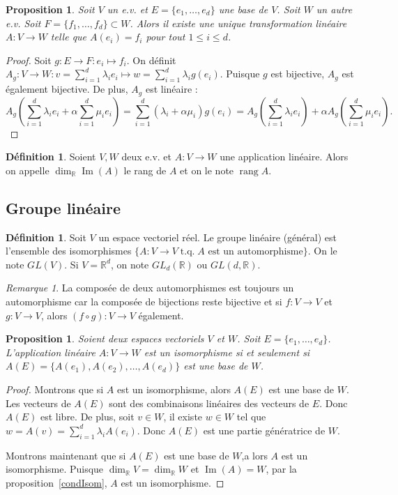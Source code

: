 \documentclass{article}
\DeclareMathOperator{\tq}{\text{ t.q. }}
\DeclareMathOperator{\Imf}{Im}
\DeclareMathOperator{\rang}{rang}
\newcommand{\R}{\mathbb R}
\newtheorem{prp}[thm]{Proposition}
\theoremstyle{definition}
\newtheorem{déf}[thm]{Définition}
\theoremstyle{remark}
\newtheorem*{rmq}{Remarque}
\begin{document}
		\begin{prp} Soit $V$ un e.v. et $E = \{e_1, \ldots, e_d\}$ une base de $V$. Soit $W$ un autre e.v. Soit $F =\{f_1, \ldots, f_d\} \subset W$. Alors il existe une unique
		transformation linéaire $A : V \to W$ telle que $A(e_i) = f_i$ pour tout $1 \leq i \leq d$. \end{prp}

		\begin{proof} Soit $g : E \to F : e_i \mapsto f_i$. On définit $A_g : V \to W : v = \sum_{i=1}^d\lambda_ie_i \mapsto w = \sum_{i=1}^d\lambda_ig(e_i)$. Puisque $g$
		est bijective, $A_g$ est également bijective. De plus, $A_g$ est linéaire :
		\[A_g\left(\sum_{i=1}^d\lambda_ie_i + \alpha\sum_{i=1}^d\mu_ie_i\right) = \sum_{i=1}^d(\lambda_i + \alpha\mu_i)g(e_i)
		= A_g\left(\sum_{i=1}^d\lambda_ie_i\right) + \alpha A_g\left(\sum_{i=1}^d\mu_ie_i\right).\] \end{proof}

		\begin{déf} Soient $V, W$ deux e.v. et $A : V \to W$ une application linéaire. Alors on appelle $\dim_\R\Imf(A)$ le rang de $A$ et on le note $\rang A$. \end{déf}
	
	\subsection{Groupe linéaire}
		\begin{déf} Soit $V$ un espace vectoriel réel. Le groupe linéaire (général) est l'ensemble des isomorphismes $\{A : V \to V \tq A \text{ est un automorphisme}\}$.
		On le note $GL(V)$. Si $V = \R^d$, on note $GL_d(\R)$ ou $GL(d, \R)$. \end{déf}

		\begin{rmq} La composée de deux automorphismes est toujours un automorphisme car la composée de bijections reste bijective et si $f : V \to V$ et $g : V \to V$, alors
		$(f \circ g) : V \to V$ également. \end{rmq}

		\begin{prp} Soient deux espaces vectoriels $V$ et $W$. Soit $E = \{e_1, \ldots, e_d\}$. L'application linéaire $A : V \to W$ est un isomorphisme si et seulement si
		$A(E) = \{A(e_1), A(e_2), \ldots, A(e_d)\}$ est une base de $W$. \end{prp}

		\begin{proof} Montrons que si $A$ est un isomorphisme, alors $A(E)$ est une base de $W$. Les vecteurs de $A(E)$ sont des combinaisons linéaires des vecteurs de $E$.
		Donc $A(E)$ est libre. De plus, soit $v \in W$, il existe $w \in W$ tel que $w = A(v) = \sum_{i=1}^d\lambda_iA(e_i)$. Donc $A(E)$ est une partie génératrice de $W$.

		Montrons maintenant que si $A(E)$ est une base de $W$,a lors $A$ est un isomorphisme. Puisque $\dim_\R V = \dim_\R W$ et $\Imf(A) = W$, par la
		proposition~\ref{condIsom}, $A$ est un isomorphisme. \end{proof}
\end{document}
